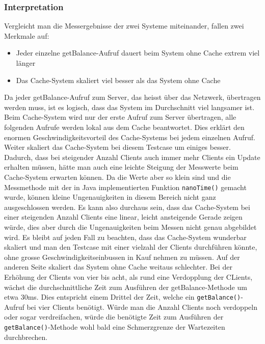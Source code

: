 \subsubsection{Interpretation}

Vergleicht man die Messergebnisse der zwei Systeme miteinander, fallen zwei Merkmale auf:
\begin{itemize}
\item Jeder einzelne getBalance-Aufruf dauert beim System ohne Cache extrem viel länger
\item Das Cache-System skaliert viel besser als das System ohne Cache
\end{itemize}

Da jeder getBalance-Aufruf zum Server, das heisst über das Netzwerk, übertragen werden muss, ist es logisch, dass das System im Durchschnitt viel langsamer ist. Beim Cache-System wird nur der erste Aufruf zum Server übertragen, alle folgenden Aufrufe werden lokal aus dem Cache beantwortet. Dies erklärt den enormen Geschwindigkeitsvorteil des Cache-Systems bei jedem einzelnen Aufruf. \newline
Weiter skaliert das Cache-System bei diesem Testcase um einiges besser. Dadurch, dass bei steigender Anzahl Clients auch immer mehr Clients ein Update erhalten müssen, hätte man auch eine leichte Steigung der Messwerte beim Cache-System erwarten können. Da die Werte aber so klein sind und die Messmethode mit der in Java implementierten Funktion \texttt{nanoTime()} gemacht wurde, können kleine Ungenauigkeiten in diesem Bereich nicht ganz ausgeschlossen werden. Es kann also durchaus sein, dass das Cache-System bei einer steigenden Anzahl Clients eine linear, leicht ansteigende Gerade zeigen würde, dies aber durch die Ungenauigkeiten beim Messen nicht genau abgebildet wird. Es bleibt auf jeden Fall zu beachten, dass das Cache-System wunderbar skaliert und man den Testcase mit einer vielzahl der Clients durchführen könnte, ohne grosse Geschwindigkeitseinbussen in Kauf nehmen zu müssen. \newline
Auf der anderen Seite skaliert das System ohne Cache weitaus schlechter. Bei der Erhöhung der Clients von vier bis acht, als rund eine Verdopplung der CLients, wächst die durchschnittliche Zeit zum Ausführen der getBalance-Methode um etwa 30ms. Dies entspricht einem Drittel der Zeit, welche ein \texttt{getBalance()}-Aufruf bei vier Clients benötigt. Würde man die Anzahl Clients noch verdoppeln oder sogar verdreifachen, würde die benötigte Zeit zum Ausführen der \texttt{getBalance()}-Methode wohl bald eine Schmerzgrenze der Wartezeiten durchbrechen.


